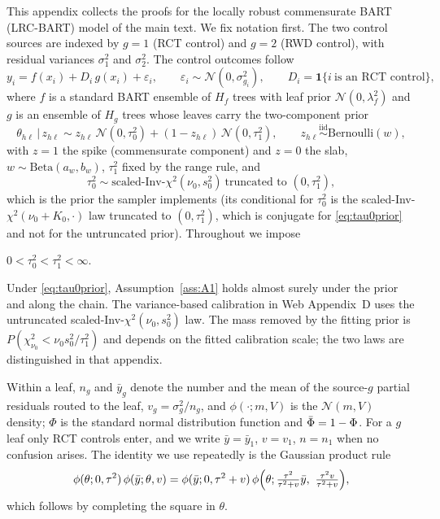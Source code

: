 \documentclass[11pt]{article}
\newcommand{\Normal}{\mathcal{N}}
\newcommand{\Ber}{\mathrm{Bernoulli}}
\newcommand{\given}{\,\vert\,}
\newcommand{\iid}{\stackrel{\text{iid}}{\sim}}
\theoremstyle{definition}
\theoremstyle{plain}
\begin{document}
{This appendix collects the proofs for the locally robust commensurate BART (LRC-BART) model of the main text. We fix notation first. The two control sources are indexed by $g=1$ (RCT control) and $g=2$ (RWD control), with residual variances $\sigma_1^2$ and $\sigma_2^2$. The control outcomes follow
\begin{equation}
y_i=f(x_i)+D_i\,g(x_i)+\varepsilon_i,\qquad \varepsilon_i\sim\Normal(0,\sigma^2_{g_i}),\qquad D_i=\mathbf 1\{i\ \text{is an RCT control}\},
\label{eqA:model}
\end{equation}
where $f$ is a standard BART ensemble of $H_f$ trees with leaf prior $\Normal(0,\lambda_f^2)$ and $g$ is an ensemble of $H_g$ trees whose leaves carry the two-component prior
\begin{equation}
\theta_{h\ell}\given z_{h\ell}\sim z_{h\ell}\,\Normal(0,\tau_0^2)+(1-z_{h\ell})\,\Normal(0,\tau_1^2),\qquad z_{h\ell}\iid\Ber(w),
\label{eqA:leafprior}
\end{equation}
with $z=1$ the spike (commensurate component) and $z=0$ the slab, $w\sim\mathrm{Beta}(a_w,b_w)$, $\tau_1^2$ fixed by the range rule, and
\begin{equation}
\tau_0^2\sim\text{scaled-Inv-}\chi^2(\nu_0,s_0^2)\ \text{truncated to }(0,\tau_1^2),
\label{eq:tau0prior}
\end{equation}
which is the prior the sampler implements (its conditional for $\tau_0^2$ is the scaled-Inv-$\chi^2(\nu_0+K_0,\cdot)$ law truncated to $(0,\tau_1^2)$, which is conjugate for \eqref{eq:tau0prior} and not for the untruncated prior). Throughout we impose
\begin{assA}[(A1)]\label{ass:A1}
$0<\tau_0^2<\tau_1^2<\infty$.
\end{assA}
\noindent Under \eqref{eq:tau0prior}, Assumption~\ref{ass:A1} holds almost surely under the prior and along the chain. The variance-based calibration in Web Appendix~D uses the untruncated scaled-Inv-$\chi^2(\nu_0,s_0^2)$ law. The mass removed by the fitting prior is $P(\chi^2_{\nu_0}<\nu_0s_0^2/\tau_1^2)$ and depends on the fitted calibration scale; the two laws are distinguished in that appendix.

Within a leaf, $n_g$ and $\bar y_g$ denote the number and the mean of the source-$g$ partial residuals routed to the leaf, $v_g=\sigma_g^2/n_g$, and $\phi(\cdot;m,V)$ is the $\Normal(m,V)$ density; $\Phi$ is the standard normal distribution function and $\bar\Phi=1-\Phi$. For a $g$ leaf only RCT controls enter, and we write $\bar y=\bar y_1$, $v=v_1$, $n=n_1$ when no confusion arises. The identity we use repeatedly is the Gaussian product rule
\begin{equation}
\phi(\theta;0,\tau^2)\,\phi(\bar y;\theta,v)=\phi(\bar y;0,\tau^2+v)\,\phi\Bigl(\theta;\tfrac{\tau^2}{\tau^2+v}\bar y,\ \tfrac{\tau^2 v}{\tau^2+v}\Bigr),
\label{eq:gaussprod}
\end{equation}
which follows by completing the square in $\theta$.

}
\end{document}
